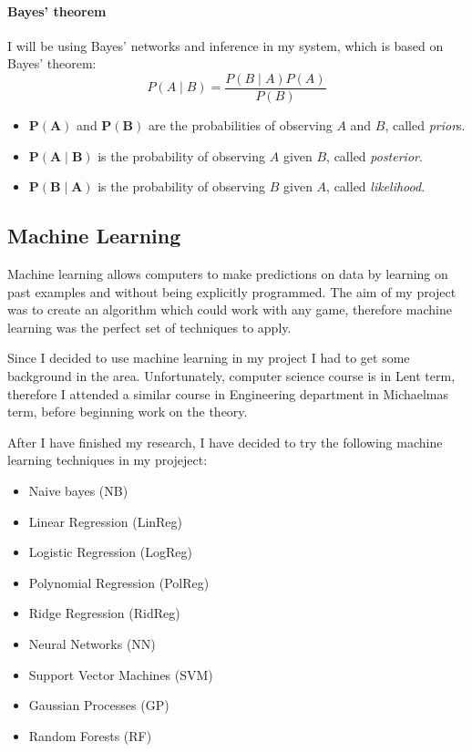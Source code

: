 \documentclass[12pt,a4paper]{book}
\begin{document}
\paragraph{Bayes' theorem}
I will be using Bayes' networks and inference in my system, which is based on Bayes' theorem:
\begin{equation}
P(A\mid B) = \frac{P(B\mid A)P(A)}{P(B)}
\end{equation}
\begin{itemize}
\item $\boldsymbol{P(A)}$ and $\boldsymbol{P(B)}$ are the probabilities of observing $A$ and $B$, called \emph{prior}s.
\item $\boldsymbol{P(A \mid B)}$ is the probability of observing $A$ given $B$, called \emph{posterior}.
\item $\boldsymbol{P(B \mid A)}$ is the probability of observing $B$ given $A$, called \emph{likelihood}.
\end{itemize}
\subsection{Machine Learning}
Machine learning allows computers to make predictions on data by learning on past examples and without being explicitly programmed.
The aim of my project was to create an algorithm which could work with any game, therefore machine learning was the perfect set of techniques to apply.

Since I decided to use machine learning in my project I had to get some background in the area.
Unfortunately, computer science course is in Lent term, therefore I attended a similar course in Engineering department in Michaelmas term, before beginning work on the theory.

After I have finished my research, I have decided to try the following machine learning techniques in my projeject:
\begin{itemize}
\item Naive bayes (NB)
\item Linear Regression (LinReg)
\item Logistic Regression (LogReg)
\item Polynomial Regression (PolReg)
\item Ridge Regression (RidReg)
\item Neural Networks (NN)
\item Support Vector Machines (SVM)
\item Gaussian Processes (GP)
\item Random Forests (RF)
\end{itemize}
\end{document}
